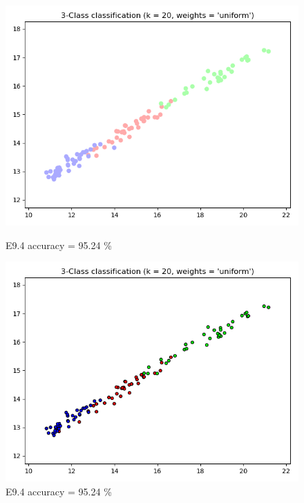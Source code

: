\documentclass{classrep}
\begin{document}
\begin{figure}[H]
\begin{minipage}{0.5\linewidth}
				\includegraphics[scale=0.25]{KNN_seed_9_7.png}
				\caption{E9.4 accuracy = 95.24 \%}
				\label{E9.4}
			\end{minipage}
			\begin{minipage}{0.5\linewidth}
				\centering
				\includegraphics[scale=0.25]{KNN_seed_9_8.png}
				\caption{E9.4 accuracy = 95.24 \%}
				\label{E9.4}
			\end{minipage}
		\end{figure}
		\FloatBarrier
\end{document}
